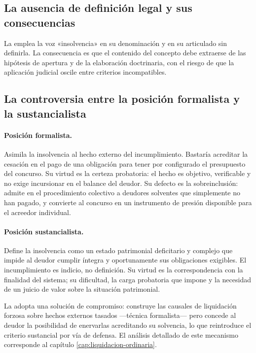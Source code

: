 \bloqueJurisprudencial
\label{sec:cap01-doctrina}

\subsection{La ausencia de definición legal y sus consecuencias}

La \LIR{} emplea la voz «insolvencia» en su denominación y en su articulado sin
definirla. La consecuencia es que el contenido del concepto debe extraerse de las
hipótesis de apertura y de la elaboración doctrinaria, con el riesgo de que la aplicación
judicial oscile entre criterios incompatibles.

\subsection{La controversia entre la posición formalista y la sustancialista}

\paragraph{Posición formalista.} Asimila la insolvencia al hecho externo del
incumplimiento. Bastaría acreditar la cesación en el pago de una obligación para tener
por configurado el presupuesto del concurso. Su virtud es la certeza probatoria: el hecho
es objetivo, verificable y no exige incursionar en el balance del deudor. Su defecto es
la sobreinclusión: admite en el procedimiento colectivo a deudores solventes que
simplemente no han pagado, y convierte al concurso en un instrumento de presión
disponible para el acreedor individual.

\paragraph{Posición sustancialista.} Define la insolvencia como un estado patrimonial
deficitario y complejo que impide al deudor cumplir íntegra y oportunamente sus
obligaciones exigibles. El incumplimiento es indicio, no definición. Su virtud es la
correspondencia con la finalidad del sistema; su dificultad, la carga probatoria que
impone y la necesidad de un juicio de valor sobre la situación patrimonial.

\medskip
La \LIR{} adopta una solución de compromiso: construye las causales de liquidación
forzosa sobre hechos externos tasados ---técnica formalista--- pero concede al deudor la
posibilidad de enervarlas acreditando su solvencia, lo que reintroduce el criterio
sustancial por vía de defensa. El análisis detallado de este mecanismo corresponde al
capítulo \ref{cap:liquidacion-ordinaria}.

